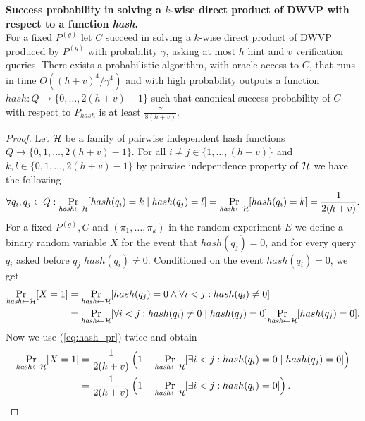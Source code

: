 %
\begin{lemma}
\label{lemma:hash_function_probability}
\textbf{Success probability in solving a $k$-wise direct product of DWVP with respect to a function \textit{hash}.} \\
For a fixed $P^{(g)}$ let $C$ succeed in solving a $k$-wise direct product of DWVP produced by $P^{(g)}$
with probability $\gamma$, asking at most $h$ hint and $v$ verification queries.
There exists a probabilistic algorithm, with oracle access to $C$, that runs in time $O((h+v)^4/\gamma^4)$
and with high probability outputs a function $hash: Q \rightarrow \{0, \dots, 2(h+v)-1\}$ such that canonical success probability of
$C$ with respect to $P_{hash}$ is at least $\frac{\gamma}{8(h+v)}$.
\end{lemma}
%
\begin{proof}
Let $\mathcal{H}$ be a family of pairwise independent hash functions $Q \rightarrow \{0,1, \dots,2(h+v)-1\}$.
For all $i \neq j \in \{1, \dots, (h+v)\}$ and $k,l \in \{0,1,\dots,2(h+v)-1\}$ by pairwise independence property of $\mathcal{H}$
we have the following
\begin{align}
  \label{eq:hash_pr}
 \forall q_i,q_j \in Q : \underset{\textit{hash} \leftarrow \mathcal{H}}{\Pr}[hash(q_i) = k \mid hash(q_j) = l] = \underset{\textit{hash} \leftarrow \mathcal{H}}{\Pr}[hash(q_i) = k] = \frac{1}{2(h+v)}.
\end{align}
For a fixed $P^{(g)}, C$ and $(\pi_1, \dots, \pi_k)$ in the random experiment $E$ we define a binary random variable $X$ for the event that $hash(q_j) = 0$, and for
every query $q_i$ asked before $q_j$ $hash(q_i) \neq 0$.
Conditioned on the event $hash(q_i) = 0$, we get
\begin{align*}
  \underset{\textit{hash} \leftarrow \mathcal{H}}{\Pr}[X=1] &= \underset{\textit{hash} \leftarrow \mathcal{H}}{\Pr}[hash(q_j) = 0 \land \forall i < j : hash(q_i) \neq 0] \\
  &=\underset{\textit{hash} \leftarrow \mathcal{H}}{\Pr}[\forall i < j : hash(q_i) \neq 0 \mid hash(q_j) = 0] \underset{\textit{hash} \leftarrow \mathcal{H}}{\Pr}[hash(q_j) = 0].
\end{align*}
Now we use (\ref{eq:hash_pr}) twice and obtain
\begin{align*}
\underset{\textit{hash} \leftarrow \mathcal{H}}{\Pr}[X=1] &=
\frac{1}{2(h+v)}\left(1 -\underset{\textit{hash} \leftarrow \mathcal{H}}{\Pr}[\exists i < j : hash(q_i) = 0 \mid hash(q_j) = 0] \right) \\
 &= \frac{1}{2(h+v)} \left( 1 -\underset{\textit{hash} \leftarrow \mathcal{H}}{\Pr}[\exists i < j : hash(q_i) = 0] \right).
\end{align*}

\end{proof}
